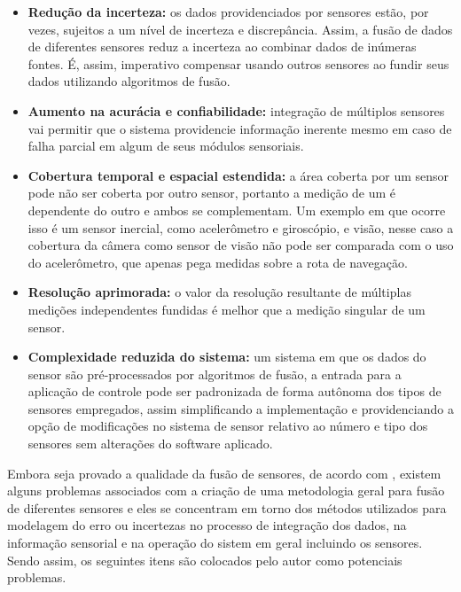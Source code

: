 \documentclass[acronym, symbols, table, deposito]{fei}
\begin{document}
			\begin{itemize}
				
				\item \textbf{Redução da incerteza:} os dados providenciados por sensores estão, por vezes, sujeitos a um nível de incerteza e discrepância. Assim, a fusão de dados de diferentes sensores reduz a incerteza ao combinar dados de inúmeras fontes. É, assim, imperativo compensar usando outros sensores ao fundir seus dados utilizando algoritmos de fusão.
				
				\item \textbf{Aumento na acurácia e confiabilidade:} integração de múltiplos sensores vai permitir que o sistema providencie informação inerente mesmo em caso de falha parcial em algum de seus módulos sensoriais.
				
				\item \textbf{Cobertura temporal e espacial estendida:} a área coberta por um sensor pode não ser coberta por outro sensor, portanto a medição de um é dependente do outro e ambos se complementam. Um exemplo em que ocorre isso é um sensor inercial, como acelerômetro e giroscópio, e visão, nesse caso a cobertura da câmera como sensor de visão não pode ser comparada com o uso do acelerômetro, que apenas pega medidas sobre a rota de navegação.
				
				\item \textbf{Resolução aprimorada:} o valor da resolução resultante de múltiplas medições independentes fundidas é melhor que a medição singular de um sensor.
				
				\item \textbf{Complexidade reduzida do sistema:} um sistema em que os dados do sensor são pré-processados por algoritmos de fusão, a entrada para a aplicação de controle pode ser padronizada de forma autônoma dos tipos de sensores empregados, assim simplificando a implementação e providenciando a opção de modificações no sistema de sensor relativo ao número e tipo dos sensores sem alterações do software aplicado.
				
			\end{itemize}
		
			Embora seja provado a qualidade da fusão de sensores, de acordo com \textcite{fung2017sensor}, existem alguns problemas associados com a criação de uma metodologia geral para fusão de diferentes sensores e eles se concentram em torno dos métodos utilizados para modelagem do erro ou incertezas no processo de integração dos dados, na informação sensorial e na operação do sistem em geral incluindo os sensores. Sendo assim, os seguintes itens são colocados pelo autor como potenciais problemas.
			
\end{document}
